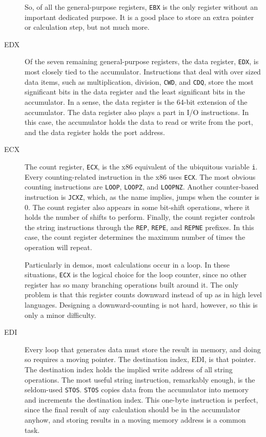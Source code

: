 \begin{description}
  So, of all the general-purpose registers, \texttt{EBX} is the only register without an
  important dedicated purpose. It is a good place to store an extra pointer or calculation
  step, but not much more.
\item[EDX] Of the seven remaining general-purpose registers, the data register,
  \texttt{EDX}, is most closely tied to the accumulator. Instructions that deal with over
  sized data items, such as multiplication, division, \texttt{CWD}, and \texttt{CDQ}, store the most
  significant bits in the data register and the least significant bits in the
  accumulator. In a sense, the data register is the 64-bit extension of the
  accumulator. The data register also plays a part in I/O instructions. In this case, the
  accumulator holds the data to read or write from the port, and the data register holds
  the port address.
\item[ECX] The count register, \texttt{ECX}, is the x86 equivalent of the ubiquitous
  variable \texttt{i}. Every counting-related instruction in the x86 uses \texttt{ECX}. The most
  obvious counting instructions are \texttt{LOOP}, \texttt{LOOPZ}, and \texttt{LOOPNZ}. Another
  counter-based instruction is \texttt{JCXZ}, which, as the name implies, jumps when the
  counter is 0. The count register also appears in some bit-shift operations, where it
  holds the number of shifts to perform. Finally, the count register controls the string
  instructions through the \texttt{REP}, \texttt{REPE}, and \texttt{REPNE} prefixes. In this
  case, the count register determines the maximum number of times the operation will
  repeat.

  Particularly in demos, most calculations occur in a loop. In these situations,
  \texttt{ECX} is the logical choice for the loop counter, since no other register has so
  many branching operations built around it. The only problem is that this register counts
  downward instead of up as in high level languages. Designing a downward-counting is not
  hard, however, so this is only a minor difficulty.
\item[EDI] Every loop that generates data must store the result in memory, and doing so
  requires a moving pointer. The destination index, EDI, is that pointer. The destination
  index holds the implied write address of all string operations. The most useful string
  instruction, remarkably enough, is the seldom-used \texttt{STOS}. \texttt{STOS} copies
  data from the accumulator into memory and increments the destination index. This
  one-byte instruction is perfect, since the final result of any calculation should be in
  the accumulator anyhow, and storing results in a moving memory address is a common task.


\end{description}
